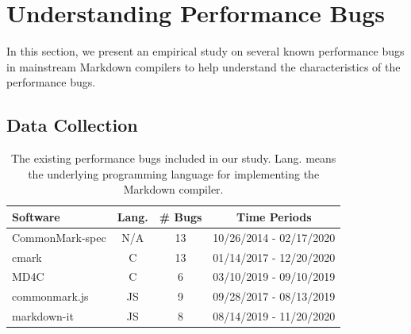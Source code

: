 \section{Understanding Performance Bugs} 
\label{s:study}
%
In this section, we present an empirical study on several known performance bugs in mainstream Markdown compilers
to help understand the characteristics of the performance bugs. %
%

\subsection{Data Collection}
\label{s:study-bug}

\begin{table}[t]
\centering
    \caption{The existing performance bugs included in our study.
    Lang. means the underlying programming language for implementing the Markdown compiler.
    }
\label{table:study-dataset}
\small
\begin{tabular}{lccc}
   \toprule
      Software  & Lang. & \# Bugs & Time Periods \\
    \midrule
    CommonMark-spec & N/A & 13 & 10/26/2014 - 02/17/2020 \\
    cmark & C & 13 & 01/14/2017 - 12/20/2020 \\
    MD4C  & C & 6 & 03/10/2019 - 09/10/2019\\
    commonmark.js  & JS & 9 & 09/28/2017 - 08/13/2019 \\
    markdown-it & JS & 8 & 08/14/2019 - 11/20/2020\\
   \bottomrule
\end{tabular}
\end{table}

